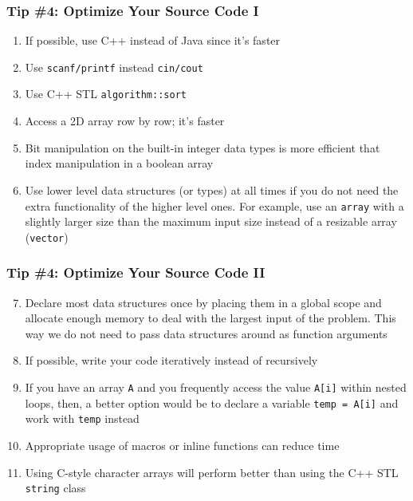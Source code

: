 \documentclass{beamer}
\begin{document}
\begin{frame}[fragile]
\frametitle{Tip \#4: Optimize Your Source Code I}

\begin{enumerate}
    \item If possible, use C++ instead of Java since it's faster
    \item Use \verb|scanf/printf| instead \verb|cin/cout|
    \item Use C++ STL \verb|algorithm::sort|
    \item Access a 2D array row by row; it's faster
    \item Bit manipulation on the built-in integer data types is more efficient that index manipulation in a boolean array
    \item Use lower level data structures (or types) at all times if you do not need the extra functionality of the higher level ones. For example, use an \verb|array| with a slightly larger size than the maximum input size instead of a resizable array (\verb|vector|)    
\end{enumerate}

\end{frame}

\begin{frame}[fragile]
\frametitle{Tip \#4: Optimize Your Source Code II}

\begin{enumerate}
	\setcounter{enumi}{6}
	\item Declare most data structures once by placing them in a global scope and allocate enough memory to deal with the largest input of the problem. This way we do not need to pass data structures around as function arguments
    \item If possible, write your code iteratively instead of recursively
    \item If you have an array \verb|A| and you frequently access the value \verb|A[i]| within nested loops, then, a better option would be to declare a variable \verb|temp = A[i]| and work with \verb|temp| instead
    \item Appropriate usage of macros or inline functions can reduce time
    \item Using C-style character arrays will perform better than using the C++ STL \verb|string| class
    
\end{enumerate}

\end{frame}
\end{document}
